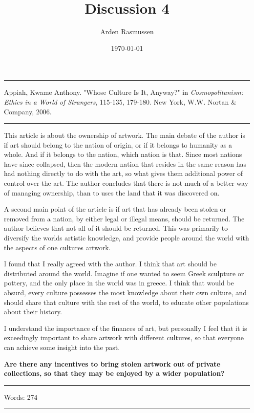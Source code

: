 \documentclass[12pt]{amsart}
\title{Discussion 4}
\author{Arden Rasmussen}
\date{\today}
\begin{document}
\maketitle

\par\noindent\rule{\textwidth}{0.4pt}

\begin{hangparas}{.25in}{1}
  Appiah, Kwame Anthony. "Whose Culture Is It, Anyway?" in
  \textit{Cosmopolitanism: Ethics in a World of Strangers}, 115-135, 179-180.
  New York, W.W. Nortan \& Company, 2006.
\end{hangparas}

\par\noindent\rule{\textwidth}{0.4pt}

This article is about the ownership of artwork. The main debate of the author
is if art should belong to the nation of origin, or if it belongs to humanity
as a whole. And if it belongs to the nation, which nation is that. Since most
nations have since collapsed, then the modern nation that resides in the same
reason has had nothing directly to do with the art, so what gives them
additional power of control over the art. The author concludes that there is
not much of a better way of managing ownership, than to uses the land that it
was discovered on.

A second main point of the article is if art that has already been stolen or
removed from a nation, by either legal or illegal means, should be returned.
The author believes that not all of it should be returned. This was primarily
to diversify the worlds artistic knowledge, and provide people around the world
with the aspects of one cultures artwork.

I found that I really agreed with the author. I think that art should be
distributed around the world. Imagine if one wanted to seem Greek sculpture or
pottery, and the only place in the world was in greece. I think that would be
absurd, every culture possesses the most knowledge about their own culture, and
should share that culture with the rest of the world, to educate other
populations about their history.

I understand the importance of the finances of art, but personally I feel that
it is exceedingly important to share artwork with different cultures, so that
everyone can achieve some insight into the past.

\textbf{Are there any incentives to bring stolen artwork out of private
collections, so that they may be enjoyed by a wider population?}

\par\noindent\rule{\textwidth}{0.4pt}

Words: 274

\par\noindent\rule{\textwidth}{0.4pt}
\end{document}
